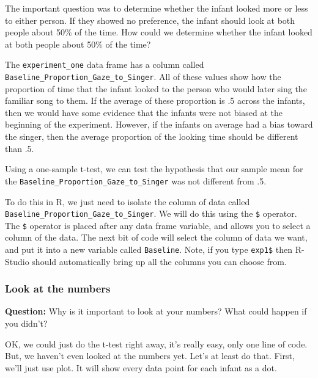\documentclass[]{book}
\newenvironment{Shaded}{\begin{snugshade}}{\end{snugshade}}
\newcommand{\StringTok}[1]{\textcolor[rgb]{0.31,0.60,0.02}{{#1}}}
\newcommand{\NormalTok}[1]{{#1}}
\theoremstyle{definition}
\theoremstyle{definition}
\theoremstyle{definition}
\theoremstyle{remark}
\begin{document}
The important question was to determine whether the infant looked more
or less to either person. If they showed no preference, the infant
should look at both people about 50\% of the time. How could we
determine whether the infant looked at both people about 50\% of the
time?

The \texttt{experiment\_one} data frame has a column called
\texttt{Baseline\_Proportion\_Gaze\_to\_Singer}. All of these values
show how the proportion of time that the infant looked to the person who
would later sing the familiar song to them. If the average of these
proportion is .5 across the infants, then we would have some evidence
that the infants were not biased at the beginning of the experiment.
However, if the infants on average had a bias toward the singer, then
the average proportion of the looking time should be different than .5.

Using a one-sample t-test, we can test the hypothesis that our sample
mean for the \texttt{Baseline\_Proportion\_Gaze\_to\_Singer} was not
different from .5.

To do this in R, we just need to isolate the column of data called
\texttt{Baseline\_Proportion\_Gaze\_to\_Singer}. We will do this using
the \texttt{\$} operator. The \texttt{\$} operator is placed after any
data frame variable, and allows you to select a column of the data. The
next bit of code will select the column of data we want, and put it into
a new variable called \texttt{Baseline}. Note, if you type
\texttt{exp1\$} then R-Studio should automatically bring up all the
columns you can choose from.

\begin{Shaded}
\end{Shaded}

\subsubsection{Look at the numbers}\label{look-at-the-numbers}

\textbf{Question:} Why is it important to look at your numbers? What
could happen if you didn't?

OK, we could just do the t-test right away, it's really easy, only one
line of code. But, we haven't even looked at the numbers yet. Let's at
least do that. First, we'll just use plot. It will show every data point
for each infant as a dot.
\end{document}
